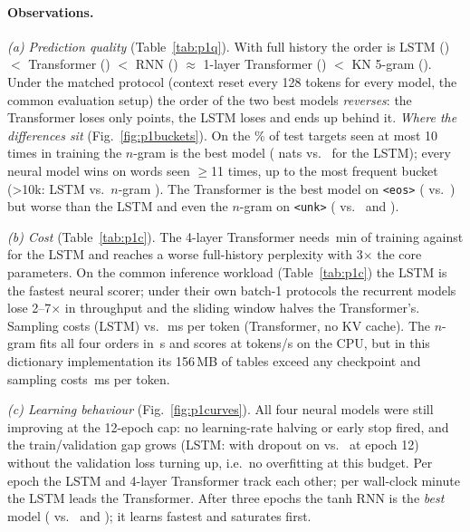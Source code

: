 \documentclass[10pt,a4paper]{article}
\begin{document}
\paragraph{Observations.}
\emph{(a) Prediction quality} (Table~\ref{tab:p1q}). With full history the order is LSTM (\pplLSTM) $<$
Transformer (\pplTransformer) $<$ RNN (\pplRNN) $\approx$ 1-layer Transformer (\pplTransformerOne) $<$
KN 5-gram (\pplNgram). Under the matched protocol (context reset every 128 tokens for every model, the common evaluation setup) the order of the two best models \emph{reverses}: the Transformer loses only \deltaBlocksTransformer{} points, the LSTM loses \deltaBlocksLSTM{} and ends up behind it. \emph{Where the differences sit} (Fig.~\ref{fig:p1buckets}). On the \fracRare\% of test targets seen at most 10 times in training the $n$-gram is the best model (\ceRareNgram{} nats vs.\ \ceRareLSTM{} for the LSTM); every neural model wins on words seen $\ge$11 times, up to the most frequent bucket (\textgreater10k: LSTM \ceTopLSTM{} vs.\ $n$-gram \ceTopNgram). The Transformer is the best model on \texttt{<eos>} (\ceEosTransformer{} vs.\ \ceEosLSTM) but worse than the LSTM and even the $n$-gram on \texttt{<unk>} (\ceUnkTransformer{} vs.\ \ceUnkLSTM{} and \ceUnkNgram).

\emph{(b) Cost} (Table~\ref{tab:p1c}). The 4-layer Transformer needs \trainMinTransformer{}\,min of training
against \trainMinLSTM{} for the LSTM and reaches a worse full-history perplexity with 3$\times$ the core
parameters. On the common inference workload (Table~\ref{tab:p1c}) the LSTM is the fastest neural scorer; under their own batch-1 protocols the recurrent models lose 2--7$\times$ in throughput and the sliding window halves the Transformer's. Sampling costs \genMsLSTM{} (LSTM) vs.\ \genMsTransformer{}\,ms per token (Transformer, no KV cache). The $n$-gram fits all four orders in \ngramSelectSec{}\,s and scores at \scoreTokSNgram{} tokens/s on the CPU, but in this dictionary implementation its 156\,MB of tables exceed any checkpoint and sampling costs \genMsNgram{}\,ms per token.

\emph{(c) Learning behaviour} (Fig.~\ref{fig:p1curves}). All four neural models were still improving at the 12-epoch cap: no learning-rate halving or early stop fired, and the train/validation gap grows (LSTM: \trainPplLastLSTM{} with dropout on vs.\ \valPplLastLSTM{} at epoch 12) without the validation loss turning up, i.e.\ no overfitting at this budget. Per epoch the LSTM and 4-layer Transformer track each other; per wall-clock minute the LSTM leads the Transformer. After three epochs the tanh RNN is the \emph{best} model (\valEpThreeRNN{} vs.\ \valEpThreeLSTM{} and \valEpThreeTransformer); it learns fastest and saturates first.
\end{document}
